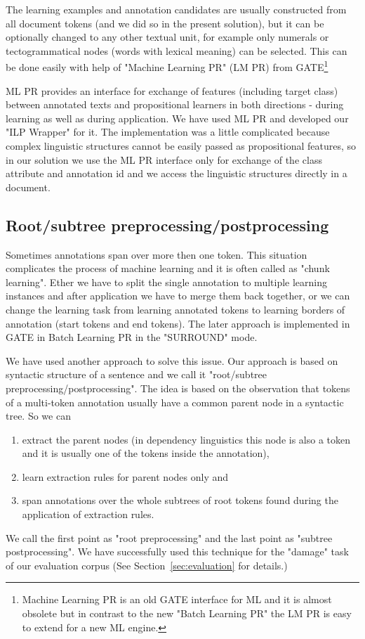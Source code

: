 \documentclass[runningheads,a4paper]{llncs}
\begin{document}
The learning examples and annotation candidates are usually constructed from all document tokens (and we did so in the present solution), but it can be optionally changed to any other textual unit, for example only numerals or tectogrammatical nodes (words with lexical meaning) can be selected. This can be done easily with help of "Machine Learning PR" (LM PR) from GATE\footnote{Machine Learning PR is an old GATE interface for ML and it is almost obsolete but in contrast to the new "Batch Learning PR" the LM PR is easy to extend for a new ML engine.}

ML PR provides an interface for exchange of features (including target class) between annotated texts and propositional learners in both directions - during learning as well as during application. We have used ML PR and developed our "ILP Wrapper" for it. The implementation was a little complicated because complex linguistic structures cannot be easily passed as propositional features, so in our solution we use the ML PR interface only for exchange of the class attribute and annotation id and we access the linguistic structures directly in a document.


\subsection{Root/subtree preprocessing/postprocessing}
Sometimes annotations span over more then one token. This situation complicates the process of machine learning and it is often called as "chunk learning". Ether we have to split the single annotation to multiple learning instances and after application we have to merge them back together, or we can change the learning task from learning annotated tokens to learning borders of annotation (start tokens and end tokens). The later approach is implemented in GATE in Batch Learning PR in the "SURROUND" mode.

We have used another approach to solve this issue. Our approach is based on syntactic structure of a sentence and we call it "root/subtree preprocessing/postprocessing". The idea is based on the observation that tokens of a multi-token annotation usually have a common parent node in a syntactic tree. So we can
\begin{enumerate}
	\item extract the parent nodes (in dependency linguistics this node is also a token and it is usually one of the tokens inside the annotation), 
	\item learn extraction rules for parent nodes only and 
	\item span annotations over the whole subtrees of root tokens found during the application of extraction rules.
\end{enumerate}
We call the first point as "root preprocessing" and the last point as "subtree postprocessing". We have successfully used this technique for the "damage" task of our evaluation corpus (See Section~\ref{sec:evaluation} for details.)
\end{document}
